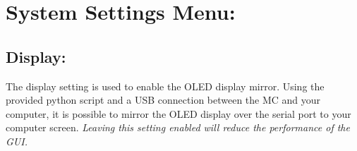 \chapter{System Settings Menu:}

\section{Display:}
The display setting is used to enable the OLED display mirror. Using the provided python script and a USB connection between the MC and your computer, it is possible to mirror the OLED display over the serial port to your computer screen.
\textit{Leaving this setting enabled will reduce the performance of the GUI.}